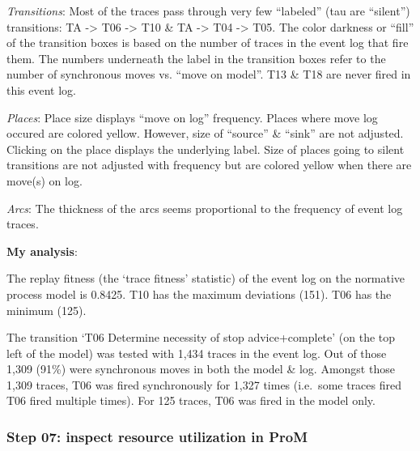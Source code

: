 \documentclass[]{article}
\begin{document}
\emph{Transitions}: Most of the traces pass through very few ``labeled''
(tau are ``silent'') transitions: TA -\textgreater{} T06 -\textgreater{}
T10 \& TA -\textgreater{} T04 -\textgreater{} T05. The color darkness or
``fill'' of the transition boxes is based on the number of traces in the
event log that fire them. The numbers underneath the label in the
transition boxes refer to the number of synchronous moves vs. ``move on
model''. T13 \& T18 are never fired in this event log.

\emph{Places}: Place size displays ``move on log'' frequency. Places
where move log occured are colored yellow. However, size of ``source''
\& ``sink'' are not adjusted. Clicking on the place displays the
underlying label. Size of places going to silent transitions are not
adjusted with frequency but are colored yellow when there are move(s) on
log.

\emph{Arcs}: The thickness of the arcs seems proportional to the
frequency of event log traces.

\textbf{My analysis}:

The replay fitness (the `trace fitness' statistic) of the event log on
the normative process model is 0.8425. T10 has the maximum deviations
(151). T06 has the minimum (125).

The transition `T06 Determine necessity of stop advice+complete' (on the
top left of the model) was tested with 1,434 traces in the event log.
Out of those 1,309 (91\%) were synchronous moves in both the model \&
log. Amongst those 1,309 traces, T06 was fired synchronously for 1,327
times (i.e.~some traces fired T06 fired multiple times). For 125 traces,
T06 was fired in the model only.

\subsubsection{Step 07: inspect resource utilization in
ProM}\label{step-07-inspect-resource-utilization-in-prom}
\end{document}
